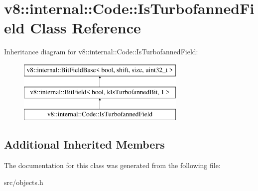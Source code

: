 \hypertarget{classv8_1_1internal_1_1_code_1_1_is_turbofanned_field}{}\section{v8\+:\+:internal\+:\+:Code\+:\+:Is\+Turbofanned\+Field Class Reference}
\label{classv8_1_1internal_1_1_code_1_1_is_turbofanned_field}
Inheritance diagram for v8\+:\+:internal\+:\+:Code\+:\+:Is\+Turbofanned\+Field\+:\begin{figure}[H]
\begin{center}
\leavevmode
\includegraphics[height=3.000000cm]{classv8_1_1internal_1_1_code_1_1_is_turbofanned_field}
\end{center}
\end{figure}
\subsection*{Additional Inherited Members}


The documentation for this class was generated from the following file\+:\begin{DoxyCompactItemize}
\item 
src/objects.\+h\end{DoxyCompactItemize}
